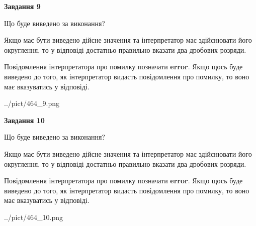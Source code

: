 \documentclass[12pt, ukrainian]{article}
\begin{document}
{\begin {Large}
{\begin {center}\textbf{Завдання 9}\end {center}}\par
Що буде виведено за виконання? \par

Якщо має бути виведено дійсне значення та інтерпретатор має здійснювати його округлення, 
то у відповіді достатньо правильно вказати два дробових розряди.

Повідомлення інтерпретатора про помилку позначати \textbf{error}.
Якщо щось буде виведено до того, як інтерпретатор видасть повідомлення про помилку, 
то воно має вказуватись у відповіді. \par

\begin{center}
	{../pict/464_9.png}
\end{center}
\newpage

{\begin {center}\textbf{Завдання 10}\end {center}}\par
Що буде виведено за виконання? \par

Якщо має бути виведено дійсне значення та інтерпретатор має здійснювати його округлення, 
то у відповіді достатньо правильно вказати два дробових розряди.

Повідомлення інтерпретатора про помилку позначати \textbf{error}.
Якщо щось буде виведено до того, як інтерпретатор видасть повідомлення про помилку, 
то воно має вказуватись у відповіді. \par

\begin{center}
	{../pict/464_10.png}
\end{center}
\newpage

\end {Large}}
\end{document}
